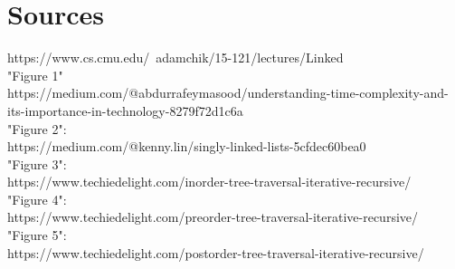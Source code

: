 \documentclass[hidelinks,11pt]{article}
\begin{document}
\section{Sources}
https://www.cs.cmu.edu/~adamchik/15-121/lectures/Linked%
\\[0.5\baselineskip]
"Figure 1"\\
https://medium.com/@abdurrafeymasood/understanding-time-complexity-and-its-importance-in-technology-8279f72d1c6a
\\[0.5\baselineskip]
"Figure 2":\\
https://medium.com/@kenny.lin/singly-linked-lists-5cfdec60bea0
\\[0.5\baselineskip]
"Figure 3":\\
https://www.techiedelight.com/inorder-tree-traversal-iterative-recursive/
\\[0.5\baselineskip]
"Figure 4":\\
https://www.techiedelight.com/preorder-tree-traversal-iterative-recursive/
\\[0.5\baselineskip]
"Figure 5":\\
https://www.techiedelight.com/postorder-tree-traversal-iterative-recursive/
\end{document}
